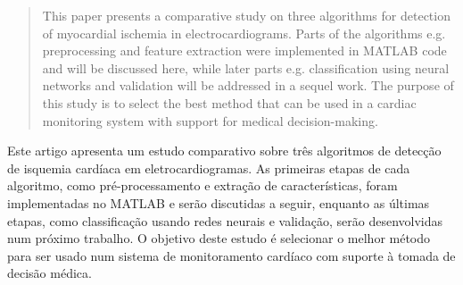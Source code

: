 
\begin{abstract}
    This paper presents a comparative study on three algorithms for detection of myocardial ischemia in electrocardiograms. Parts of the algorithms e.g. preprocessing and feature extraction were implemented in MATLAB code and will be discussed here, while later parts e.g. classification using neural networks and validation will be addressed in a sequel work. The purpose of this study is to select the best method that can be used in a cardiac monitoring system with support for medical decision-making.
\end{abstract}

\begin{resumo}
    Este artigo apresenta um estudo comparativo sobre três algoritmos de detecção de isquemia cardíaca em eletrocardiogramas. As primeiras etapas de cada algoritmo, como pré-processamento e extração de características, foram implementadas no MATLAB e serão discutidas a seguir, enquanto as últimas etapas, como classificação usando redes neurais e validação, serão desenvolvidas num próximo trabalho. O objetivo deste estudo é selecionar o melhor método para ser usado num sistema de monitoramento cardíaco com suporte à tomada de decisão médica.
\end{resumo}

